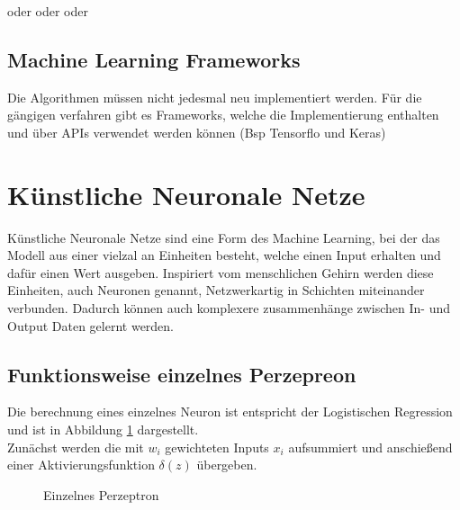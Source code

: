 \cite{hastieElementsStatisticalLearning2009} oder \cite{michelucciAdvancedAppliedDeep2019a} 
oder \cite{osingaDeepLearningCookbook2018}
oder \cite{goodfellowDeepLearning2016a}



\subsection{Machine Learning Frameworks}

Die Algorithmen müssen nicht jedesmal neu implementiert werden. 
Für die gängigen verfahren gibt es Frameworks, welche 
die Implementierung enthalten und über APIs verwendet 
werden können (Bsp Tensorflo und Keras)




\section{Künstliche Neuronale Netze} \label{sec:nn}


Künstliche Neuronale Netze sind eine Form des Machine Learning, 
bei der das Modell aus einer vielzal an Einheiten besteht, welche 
einen Input erhalten und dafür einen Wert ausgeben. Inspiriert 
vom menschlichen Gehirn werden diese Einheiten, auch Neuronen genannt, 
Netzwerkartig in Schichten miteinander verbunden. Dadurch können 
auch komplexere zusammenhänge zwischen In- und Output Daten 
gelernt werden.

\subsection{Funktionsweise einzelnes Perzepreon}\label{subsec:percepron}

Die berechnung eines einzelnes Neuron ist entspricht der Logistischen 
Regression und ist in Abbildung \ref{fig:neuron} dargestellt.
\\
Zunächst werden die mit $w_{i}$ gewichteten Inputs $x_{i}$ aufsummiert 
und anschießend einer Aktivierungsfunktion $\delta(z)$ übergeben.

\begin{figure}[htb]
    \centering
    
    \caption{Einzelnes Perzeptron}
    \label{fig:neuron}
\end{figure}

